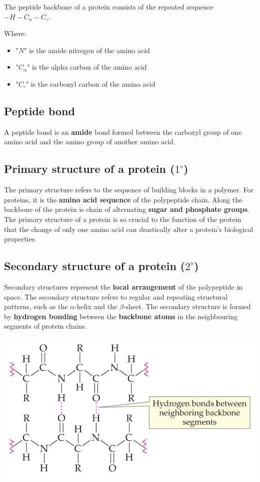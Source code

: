 \documentclass[11pt]{article}
\begin{document}
The peptide backbone of a protein consists of the repeated sequence \(-H-C_{\alpha}-C_{\circ}\).

Where:
\begin{itemize}
\item "\(N\)" is the amide nitrogen of the amino acid
\item "\(C_{\alpha}\)" is the alpha carbon of the amino acid
\item "\(C_{\circ}\)" is the carbonyl carbon of the amino acid
\end{itemize}

\subsection{Peptide bond}
\label{sec:org8b13be8}
A peptide bond is an \textbf{amide} bond formed between the carboxyl group of one amino acid and the amino group of another amino acid.

\subsection{Primary structure of a protein (\(1^{\circ}\))}
\label{sec:orgd9e778c}
The primary structure refers to the sequence of building blocks in a polymer. For proteins, it is the \textbf{amino acid sequence} of the polypeptide chain. Along the backbone of the protein is chain of alternating \textbf{sugar and phosphate groups}. The primary structure of a protein is so crucial to the function of the protein that the change of only one amino acid can drastically alter a protein's biological properties.

\subsection{Secondary structure of a protein (\(2^{\circ}\))}
\label{sec:org129f6fb}
Secondary structures represent the \textbf{local arrangement} of the polypeptide in space. The secondary structure refers to regular and repeating structural patterns, such as the \(\alpha\)-helix and the \(\beta\)-sheet. The secondary structure is formed by \textbf{hydrogen bonding} between the \textbf{backbone atoms} in the neighbouring segments of protein chains.

\begin{center}
\includegraphics[width=.9\linewidth]{./images/protein-hydrogen-bond.png}
\end{center}
\end{document}
